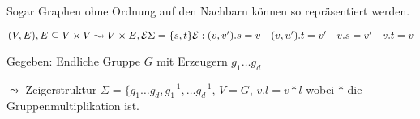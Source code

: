 \begin{beispiel}

    Sogar Graphen ohne Ordnung auf den Nachbarn können so repräsentiert werden.

    $(V, E), E \subseteq V \times V
    \\
    \leadsto V \times E, \mathcal{E}
    \\
    \Sigma = \{ s, t \}
    \\
    \mathcal{E}: (v, v').s = v
    \\ \quad  (v, u').t = v'
    \\ \quad  v.s = v'
    \\ \quad  v.t = v
    $

\end{beispiel}

\begin{beispiel}

    Gegeben: Endliche Gruppe $G$ mit Erzeugern $g_1 \dots g_d$

    $\leadsto$ Zeigerstruktur $\Sigma = \{ g_1 \dots g_d, g_1^{-1} ,\dots g_d^{-1}$,
    $V = G$,
    $v.l = v * l$ wobei $*$ die Gruppenmultiplikation ist.

\end{beispiel}




